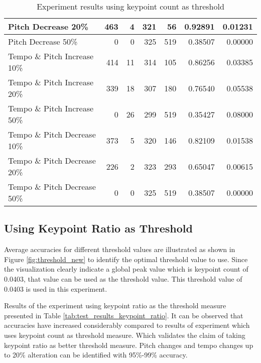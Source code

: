 \begin{table}[H]
\begin{tabular}{|l|r|r|r|r|r|r|}
        Pitch Decrease 20\%                & 463         & 4           & 321         & 56          & 0.92891           & 0.01231          \\ \hline
        Pitch Decrease 50\%                & 0           & 0           & 325         & 519         & 0.38507           & 0.00000          \\ \hline
        Tempo \& Pitch Increase 10\%       & 414         & 11          & 314         & 105         & 0.86256           & 0.03385          \\ \hline
        Tempo \& Pitch Increase 20\%       & 339         & 18          & 307         & 180         & 0.76540           & 0.05538          \\ \hline
        Tempo \& Pitch Increase 50\%       & 0           & 26          & 299         & 519         & 0.35427           & 0.08000          \\ \hline
        Tempo \& Pitch Decrease 10\%       & 373         & 5           & 320         & 146         & 0.82109           & 0.01538          \\ \hline
        Tempo \& Pitch Decrease 20\%       & 226         & 2           & 323         & 293         & 0.65047           & 0.00615          \\ \hline
        Tempo \& Pitch Decrease 50\%       & 0           & 0           & 325         & 519         & 0.38507           & 0.00000          \\ \hline
    \end{tabular}
    \caption{Experiment results using keypoint count as threshold}
    \label{tab:test_results_keypoint}
\end{table}


\subsection{Using Keypoint Ratio as Threshold}

Average accuracies for different threshold values are illustrated as shown in Figure \ref{fig:threshold_new} to identify the optimal threshold value to use. Since
the visualization clearly indicate a global peak value which is keypoint count of 0.0403, that value can be used as the threshold value. This threshold value of 
0.0403 is used in this experiment. 
\vspace{12pt}

Results of the experiment using keypoint ratio as the threshold measure presented in Table \ref{tab:test_results_keypoint_ratio}. It can be observed that accuracies
have increased considerably compared to results of experiment which uses keypoint count as threshold measure. Which validates the claim of taking keypoint ratio as
better threshold measure. Pitch changes and tempo changes up to 20\% alteration can be identified with 95\%-99\% accuracy.

